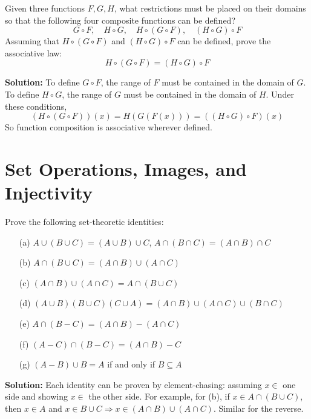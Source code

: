 \begin{problembox}
Given three functions \( F, G, H \), what restrictions must be placed on their domains so that the following four composite functions can be defined?
\[
G \circ F, \quad H \circ G, \quad H \circ (G \circ F), \quad (H \circ G) \circ F
\]
Assuming that \( H \circ (G \circ F) \) and \( (H \circ G) \circ F \) can be defined, prove the associative law:
\[
H \circ (G \circ F) = (H \circ G) \circ F
\]
\end{problembox}

\textbf{Solution:}  
To define \( G \circ F \), the range of \( F \) must be contained in the domain of \( G \).  
To define \( H \circ G \), the range of \( G \) must be contained in the domain of \( H \).  
Under these conditions,  
\[
(H \circ (G \circ F))(x) = H(G(F(x))) = ((H \circ G) \circ F)(x)
\]  
So function composition is associative wherever defined.

\section{Set Operations, Images, and Injectivity}
\begin{problembox}
Prove the following set-theoretic identities:
\begin{itemize}
\item[(a)] \( A \cup (B \cup C) = (A \cup B) \cup C \), \quad \( A \cap (B \cap C) = (A \cap B) \cap C \)
\item[(b)] \( A \cap (B \cup C) = (A \cap B) \cup (A \cap C) \)
\item[(c)] \( (A \cap B) \cup (A \cap C) = A \cap (B \cup C) \)
\item[(d)] \( (A \cup B)(B \cup C)(C \cup A) = (A \cap B) \cup (A \cap C) \cup (B \cap C) \)
\item[(e)] \( A \cap (B - C) = (A \cap B) - (A \cap C) \)
\item[(f)] \( (A - C) \cap (B - C) = (A \cap B) - C \)
\item[(g)] \( (A - B) \cup B = A \) if and only if \( B \subseteq A \)
\end{itemize}
\end{problembox}

\textbf{Solution:}  
Each identity can be proven by element-chasing: assuming \( x \in \) one side and showing \( x \in \) the other side.  
For example, for (b), if \( x \in A \cap (B \cup C) \), then \( x \in A \) and \( x \in B \cup C \Rightarrow x \in (A \cap B) \cup (A \cap C) \). Similar for the reverse.

